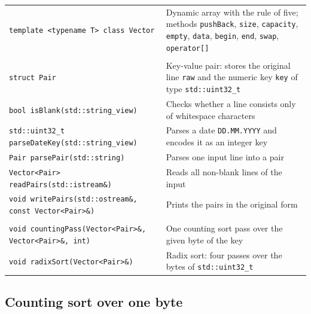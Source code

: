 \begin{table}[!ht]
\centering
\begin{tabular}{|P{7.5cm}|P{7.5cm}|}
\hline
{}
 \\
\hline
\texttt{template <typename T> class Vector} & Dynamic array with the rule of five; methods \texttt{pushBack}, \texttt{size}, \texttt{capacity}, \texttt{empty}, \texttt{data}, \texttt{begin}, \texttt{end}, \texttt{swap}, \texttt{operator[]} \\
\hline
{}
 \\
\hline
\texttt{struct Pair} & Key-value pair: stores the original line \texttt{raw} and the numeric key \texttt{key} of type \texttt{std::uint32\_t} \\
\hline
\texttt{bool isBlank(std::string\_view)} & Checks whether a line consists only of whitespace characters \\
\hline
\texttt{std::uint32\_t parseDateKey(std::string\_view)} & Parses a date \texttt{DD.MM.YYYY} and encodes it as an integer key \\
\hline
\texttt{Pair parsePair(std::string)} & Parses one input line into a pair \\
\hline
\texttt{Vector<Pair> readPairs(std::istream\&)} & Reads all non-blank lines of the input \\
\hline
\texttt{void writePairs(std::ostream\&, const Vector<Pair>\&)} & Prints the pairs in the original form \\
\hline
{}
 \\
\hline
\texttt{void countingPass(Vector<Pair>\&, Vector<Pair>\&, int)} & One counting sort pass over the given byte of the key \\
\hline
\texttt{void radixSort(Vector<Pair>\&)} & Radix sort: four passes over the bytes of \texttt{std::uint32\_t} \\
\hline
\end{tabular}
\end{table}







\subsection{Counting sort over one byte}

